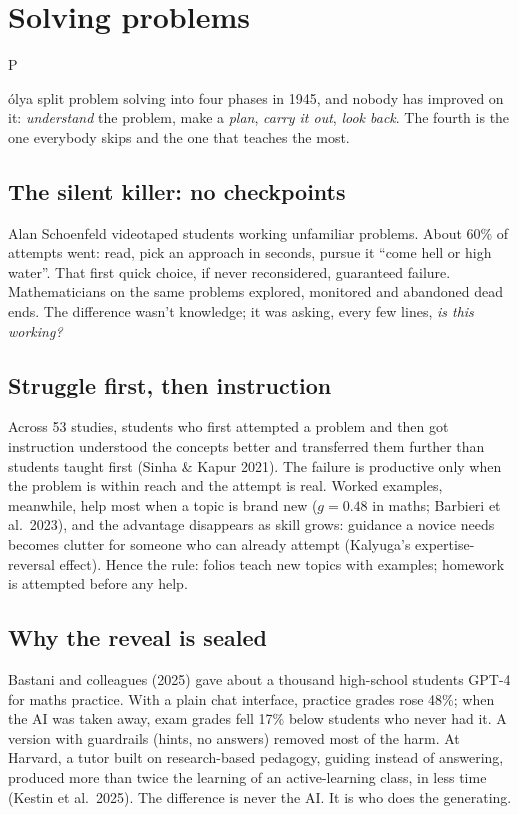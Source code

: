 \documentclass{kaelearn}
\begin{document}

\section{Solving problems}

\opening{P}{ólya} split problem solving into four phases in 1945, and nobody has improved on it:
\emph{understand} the problem, make a \emph{plan}, \emph{carry it out}, \emph{look back}. The
fourth is the one everybody skips and the one that teaches the most.

\subsection{The silent killer: no checkpoints}
Alan Schoenfeld videotaped students working unfamiliar problems. About 60\% of attempts went:
read, pick an approach in seconds, pursue it ``come hell or high water''. That first quick choice,
if never reconsidered, guaranteed failure. Mathematicians on the same problems explored, monitored
and abandoned dead ends. The difference wasn't knowledge; it was asking, every few lines,
\emph{is this working?}

\subsection{Struggle first, then instruction}
Across 53 studies, students who first attempted a problem and then got instruction understood the
concepts better and transferred them further than students taught first (Sinha \& Kapur 2021).
The failure is productive only when the problem is within reach and the attempt is real. Worked
examples, meanwhile, help most when a topic is brand new ($g=0.48$ in maths; Barbieri et al.\ 2023),
and the advantage disappears as skill grows: guidance a novice needs becomes clutter for someone who
can already attempt (Kalyuga's expertise-reversal effect). Hence the rule: folios teach new topics
with examples; homework is attempted before any help.

\subsection{Why the reveal is sealed}
Bastani and colleagues (2025) gave about a thousand high-school students GPT-4 for maths practice.
With a plain chat interface, practice grades rose 48\%; when the AI was taken away, exam grades
fell 17\% below students who never had it. A version with guardrails (hints, no answers) removed
most of the harm. At Harvard, a tutor built on research-based pedagogy, guiding instead of answering,
produced more than twice the learning of an active-learning class, in less time (Kestin et al.\
2025). The difference is never the AI. It is who does the generating.
\end{document}
